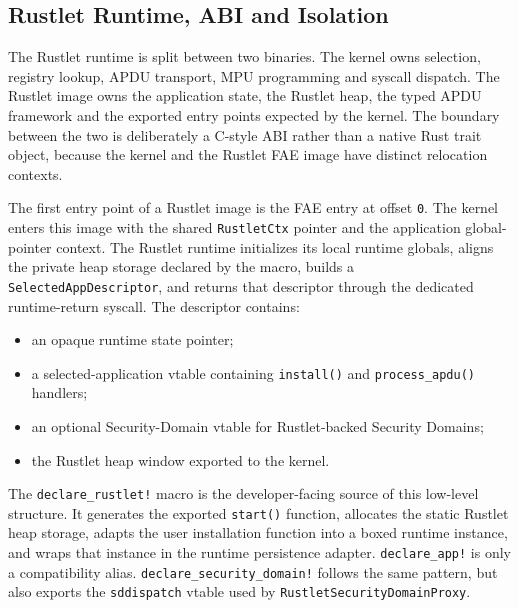 \subsection{Rustlet Runtime, ABI and Isolation}
\label{sec:impl-rustlet-runtime}

The Rustlet runtime is split between two binaries. The kernel owns selection,
registry lookup, APDU transport, MPU programming and syscall dispatch. The
Rustlet image owns the application state, the Rustlet heap, the typed APDU
framework and the exported entry points expected by the kernel. The boundary
between the two is deliberately a C-style ABI rather than a native Rust trait
object, because the kernel and the Rustlet FAE image have distinct relocation
contexts.

The first entry point of a Rustlet image is the FAE entry at offset
\texttt{0}. The kernel enters this image with the shared
\texttt{RustletCtx} pointer and the application global-pointer context. The
Rustlet runtime initializes its local runtime globals, aligns the private heap
storage declared by the macro, builds a \texttt{SelectedAppDescriptor}, and
returns that descriptor through the dedicated runtime-return syscall. The
descriptor contains:
\begin{itemize}
\item an opaque runtime state pointer;
\item a selected-application vtable containing \texttt{install()} and
  \texttt{process\_apdu()} handlers;
\item an optional Security-Domain vtable for Rustlet-backed Security Domains;
\item the Rustlet heap window exported to the kernel.
\end{itemize}

The \texttt{declare\_rustlet!} macro is the developer-facing source of this
low-level structure. It generates the exported \texttt{start()} function,
allocates the static Rustlet heap storage, adapts the user installation
function into a boxed runtime instance, and wraps that instance in the runtime
persistence adapter. \texttt{declare\_app!} is only a compatibility alias.
\texttt{declare\_security\_domain!} follows the same pattern, but also exports
the \texttt{sddispatch} vtable used by
\texttt{RustletSecurityDomainProxy}.

